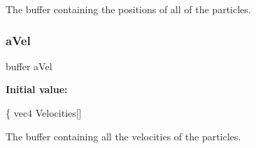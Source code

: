 The buffer containing the positions of all of the particles. 

\mbox{\label{particle_8comp_a8873b6c4414371b20f8c9adb4fbb0b0e}} 
\subsubsection{\texorpdfstring{a\+Vel}{aVel}}
{\footnotesize\ttfamily buffer a\+Vel}

{\bfseries Initial value\+:}
\begin{DoxyCode}
\{
    vec4 Velocities[]
\end{DoxyCode}


The buffer containing all the velocities of the particles. 

